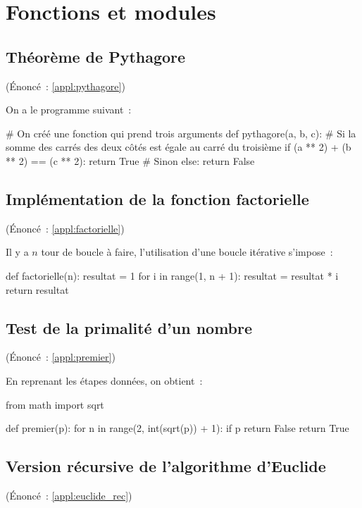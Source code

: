 \section{Fonctions et modules}

	\subsection{Théorème de Pythagore} \label{corr:pythagore} (Énoncé~: \ref{appl:pythagore})
	
		On a le programme suivant~:
		\begin{pythoncode}
				# On créé une fonction qui prend trois arguments
				def pythagore(a, b, c):
					# Si la somme des carrés des deux côtés est égale au carré du troisième
					if (a ** 2) + (b ** 2) == (c ** 2):
						return True
					# Sinon
					else:
						return False
			\end{pythoncode}
	
	\subsection{Implémentation de la fonction factorielle} \label{corr:factorielle} (Énoncé~: \ref{appl:factorielle})
		
		Il y a $n$ tour de boucle à faire, l'utilisation d'une boucle itérative s'impose~:
		\begin{pythoncode}
			def factorielle(n):
				resultat = 1
				for i in range(1, n + 1):
					resultat = resultat * i
				return resultat
		\end{pythoncode}

	\subsection{Test de la primalité d'un nombre} \label{corr:premier} (Énoncé~: \ref{appl:premier})
	
		En reprenant les étapes données, on obtient~:
		\begin{pythoncode}
			from math import sqrt
	
			def premier(p):
				for n in range(2, int(sqrt(p)) + 1):
					if p %
						return False
				return True
		\end{pythoncode}
	
	\subsection{Version récursive de l'algorithme d'Euclide} \label{corr:euclide_rec} (Énoncé~: \ref{appl:euclide_rec})
		
